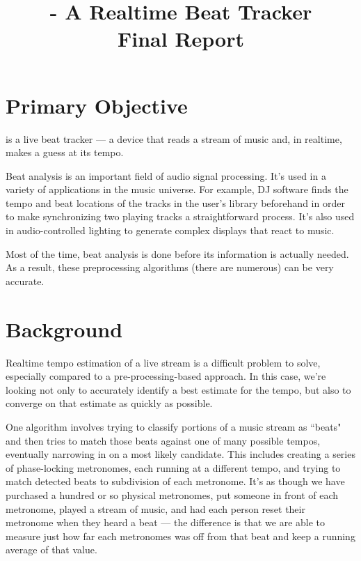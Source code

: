 \documentclass[letterpaper]{article}
\title{\projname{} - A Realtime Beat Tracker \\ Final Report}
\begin{document}
\maketitle

\section{Primary Objective}
    \projname is a live beat tracker --- a device that reads a stream of music
    and, in realtime, makes a guess at its tempo.  

    Beat analysis is an important field of audio signal processing.  It's used
    in a variety of applications in the music universe.  For example, DJ
    software finds the tempo and beat locations of the tracks in the user's
    library beforehand in order to make synchronizing two playing tracks a
    straightforward process.  It's also used in audio-controlled lighting to
    generate complex displays that react to music.

    Most of the time, beat analysis is done before its information is actually
    needed.  As a result, these preprocessing algorithms (there are numerous)
    can be very accurate.


\section{Background}

    Realtime tempo estimation of a live stream is a difficult problem to solve,
    especially compared to a pre-processing-based approach.  In this case,
    we're looking not only to accurately identify a best estimate for the
    tempo, but also to converge on that estimate as quickly as possible.

    One algorithm involves trying to classify portions of a music stream as
    ``beats" and then tries to match those beats against one of many possible
    tempos, eventually narrowing in on a most likely candidate.  This includes
    creating a series of phase-locking metronomes, each running at a different
    tempo, and trying to match detected beats to subdivision of each metronome.
    It's as though we have purchased a hundred or so physical metronomes, put
    someone in front of each metronome, played a stream of music, and had each
    person reset their metronome when they heard a beat --- the difference is
    that we are able to measure just how far each metronomes was off from that
    beat and keep a running average of that value.
\end{document}
